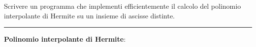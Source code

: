 Scrivere un programma che implementi efficientemente il calcolo del polinomio interpolante di Hermite su un insieme di ascisse distinte.

\hspace{1cm}
\par\noindent\rule{\textwidth}{0.4pt}
\hspace{1cm}

\textbf{Polinomio interpolante di Hermite}:

